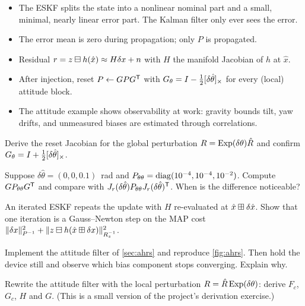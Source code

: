 \begin{takeaways}
\begin{itemize}
  \item The ESKF splits the state into a nonlinear nominal part and a small, minimal, nearly linear error part. The Kalman filter only ever sees the
        error.
  \item The error mean is zero during propagation; only $P$ is propagated.
  \item Residual $r = z\boxminus h(\hat x) \approx H\delta x + n$ with $H$ the manifold Jacobian of $h$ at $\hat x$.
  \item After injection, reset $P \gets GPG^{\mathsf{T}}$ with $G_\theta = I - \tfrac12[\delta\hat\theta]_{\times}$ for every (local) attitude block.
  \item The attitude example shows observability at work: gravity bounds tilt, yaw drifts, and unmeasured biases are estimated through
        correlations.
\end{itemize}
\end{takeaways}

\begin{exercises}
  \item Derive the reset Jacobian for the global perturbation $R = \operatorname{Exp}(\delta\theta)\hat R$ and confirm $G_\theta = I + \tfrac12[\delta\hat\theta]_{\times}$.
  \item Suppose $\delta\hat\theta = (0, 0, 0.1)$~rad and $P_{\theta\theta} = \operatorname{diag}(10^{-4}, 10^{-4}, 10^{-2})$. Compute $GP_{\theta\theta}G^{\mathsf{T}}$ and compare with
        $J_r(\delta\hat\theta)P_{\theta\theta}J_r(\delta\hat\theta)^{\mathsf{T}}$. When is the difference noticeable?
  \item An iterated ESKF repeats the update with $H$ re-evaluated at $\hat x\boxplus\delta\hat x$. Show that one iteration is a Gauss--Newton step on the MAP cost
        $\|\delta x\|^2_{P^{-1}} + \|z\boxminus h(\hat x\boxplus\delta x)\|^2_{R_z^{-1}}$.
  \item Implement the attitude filter of \cref{sec:ahrs} and reproduce \cref{fig:ahrs}. Then hold the device still and observe which bias component stops
        converging. Explain why.
  \item Rewrite the attitude filter with the local perturbation $R = \hat R\operatorname{Exp}(\delta\theta)$: derive $F_c$, $G_c$, $H$ and $G$. (This is a small version of the project's
        derivation exercise.)
\end{exercises}

